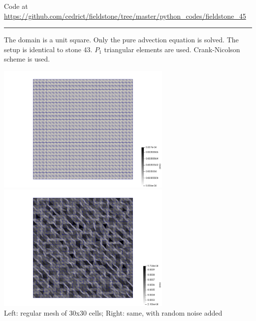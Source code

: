 

\begin{center}
Code at \url{https://github.com/cedrict/fieldstone/tree/master/python_codes/fieldstone_45}
\end{center}

\par\noindent\rule{\textwidth}{0.4pt}


The domain is a unit square. Only the pure advection equation is solved. The setup 
is identical to stone 43. $P_1$ triangular elements are used. Crank-Nicolson scheme is used.
 

\begin{center}
\includegraphics[width=8.5cm]{python_codes/fieldstone_45/results/mesh_reg}
\includegraphics[width=8.5cm]{python_codes/fieldstone_45/results/mesh_rand}\\
{\captionfont Left: regular mesh of 30x30 cells; Right: same, with random noise added}
\end{center}

